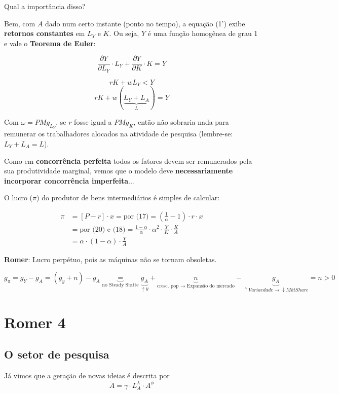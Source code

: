 \documentclass[a4paper,12pt]{article}[abntex2]
\begin{document}
Qual a importância disso?

Bem, com $A$ dado num certo instante (ponto no tempo), a equação (1') exibe \textbf{retornos constantes} em $L_Y$ e $K$. Ou seja, $Y$ é uma função homogênea de grau 1 e vale o \textbf{Teorema de Euler}:

\[
\frac{\partial Y}{\partial L_Y} \cdot L_Y + \frac{\partial Y}{\partial K} \cdot K = Y
\]

\[
rK+wL_Y<Y
\]
\[
rK+w(\underbrace{L_Y+L_A}_L)=Y
\]

Com $\omega = PMg_{L_Y}$, se $r$ fosse igual a $PMg_K$, então não sobraria nada para remunerar os trabalhadores alocados na atividade de pesquisa 
(lembre-se: $L_Y + L_A = L$).

Como em \textbf{concorrência perfeita} todos os fatores devem ser remunerados pela sua produtividade marginal, vemos que o modelo deve \textbf{necessariamente incorporar concorrência imperfeita}...


O lucro ($\pi$) do produtor de bens intermediários é simples de calcular:

\begin{align*}
\pi &= [P - r] \cdot x = \text{por (17)} = \left( \frac{1}{\alpha} - 1 \right) \cdot r \cdot x \\
    &= \text{por (20) e (18)} = \frac{1 - \alpha}{\alpha} \cdot \alpha^2 \cdot \frac{Y}{K} \cdot \frac{K}{A} \\
    &= \alpha \cdot (1 - \alpha) \cdot \frac{Y}{A} \tag{21}
\end{align*}

\textbf{Romer}: Lucro perpétuo, pois as máquinas não se tornam obsoletas.

\[
g_\pi=g_Y-g_A = (g_y+n)-g_A\underbrace{=}_\text{no Steady Statte}\underbrace{g_A}_{\uparrow y}+\underbrace{n}_\text{cresc. pop \(\rightarrow\) Expansão do mercado}-\underbrace{g_A}_{\uparrow Variaedade \rightarrow \downarrow Mkt Share}=n>0
\]

\newpage
\section{\textbf{Romer 4}}
\subsection{\textbf{O setor de pesquisa}}


Já vimos que a geração de novas ideias é descrita por
\[
\dot{A} = \gamma \cdot L_A^\lambda \cdot A^\phi \tag{4, acima}
\]
\end{document}

